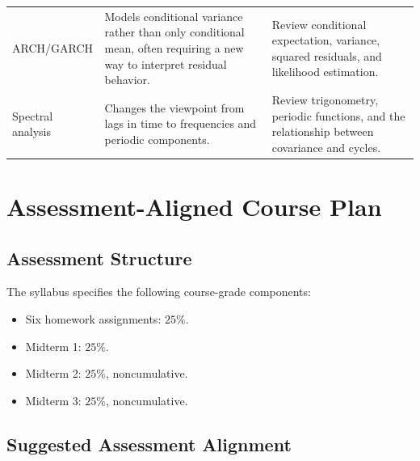\documentclass[11pt]{article}
\begin{document}
\begin{longtable}{p{} p{} p{}}
ARCH/GARCH &
Models conditional variance rather than only conditional mean, often requiring
a new way to interpret residual behavior. &
Review conditional expectation, variance, squared residuals, and likelihood
estimation. \\

Spectral analysis &
Changes the viewpoint from lags in time to frequencies and periodic
components. &
Review trigonometry, periodic functions, and the relationship between
covariance and cycles. \\

\bottomrule
\end{longtable}

\section{Assessment-Aligned Course Plan}

\subsection{Assessment Structure}

The syllabus specifies the following course-grade components:

\begin{itemize}
    \item Six homework assignments: \(25\%\).
    \item Midterm 1: \(25\%\).
    \item Midterm 2: \(25\%\), noncumulative.
    \item Midterm 3: \(25\%\), noncumulative.
\end{itemize}

\subsection{Suggested Assessment Alignment}
\end{document}
